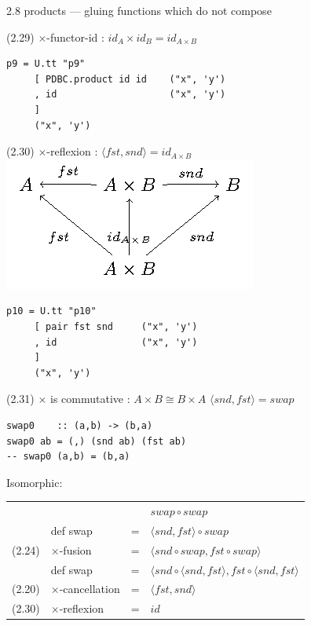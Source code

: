\documentclass[presentation]{beamer}
\begin{document}
\begin{frame}[fragile,label=sec-7]{2.8 products --- gluing functions which do not compose}
\begin{block}{(2.29) $\times$-functor-id : $id_A \times id_B = id_{A \times B}$}
\begin{verbatim}
p9 = U.tt "p9"
     [ PDBC.product id id    ("x", 'y')
     , id                    ("x", 'y')
     ]
     ("x", 'y')
\end{verbatim}
\end{block}

\begin{block}{(2.30) $\times$-reflexion : $\langle fst,snd \rangle = id_{A \times B}$}
\includegraphics[width=.9\linewidth]{./product-reflexion.png}

\begin{verbatim}
p10 = U.tt "p10"
     [ pair fst snd     ("x", 'y')
     , id               ("x", 'y')
     ]
     ("x", 'y')
\end{verbatim}
\end{block}

\begin{block}{(2.31) $\times$ is commutative : $A \times B \cong B \times A$}
$\langle snd,fst \rangle = swap$

\begin{verbatim}
swap0    :: (a,b) -> (b,a)
swap0 ab = (,) (snd ab) (fst ab)
-- swap0 (a,b) = (b,a)
\end{verbatim}

Isomorphic:

\begin{center}
\begin{tabular}{llll}
 &  &  & $swap \circ swap$\\
 & def swap & = & $\langle snd,fst \rangle \circ swap$\\
(2.24) & $\times$-fusion & = & $\langle snd \circ swap,fst \circ swap \rangle$\\
 & def swap & = & $\langle snd \circ \langle snd,fst \rangle, fst \circ \langle snd,fst \rangle$\\
(2.20) & $\times$-cancellation & = & $\langle fst,snd \rangle$\\
(2.30) & $\times$-reflexion & = & $id$\\
\end{tabular}
\end{center}


\end{block}
\end{frame}
\end{document}
